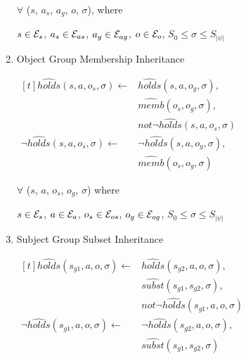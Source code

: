 \documentclass[10pt, twocolumn]{article}
\begin{document}
\begin{enumerate}
                $\forall$ ($s$, $a_{s}$, $a_{g}$, $o$, $\sigma$), where

                $s \in {\cal E}_{s}$,
                $a_{s} \in {\cal E}_{as}$,
                $a_{g} \in {\cal E}_{ag}$,
                $o \in {\cal E}_{o}$,
                $S_{0} \leq \sigma \leq S_{|\psi|}$

              \item
                Object Group Membership Inheritance

                \begin{math}
                  \begin{aligned}[t]
                    \hat{holds}(s, a, o_{s}, \sigma) \leftarrow &
                    \hat{holds}(s, a, o_{g}, \sigma), \\
                    & \hat{memb}(o_{s}, o_{g}, \sigma), \\
                    & not \lnot \hat{holds}(s, a, o_{s}, \sigma) \\
                    \lnot \hat{holds}(s, a, o_{s}, \sigma) \leftarrow &
                    \lnot \hat{holds}(s, a, o_{g}, \sigma), \\
                    & \hat{memb}(o_{s}, o_{g}, \sigma)
                  \end{aligned}
                \end{math}

                $\forall$ ($s$, $a$, $o_{s}$, $o_{g}$, $\sigma$) where

                $s \in {\cal E}_{s}$,
                $a \in {\cal E}_{a}$,
                $o_{s} \in {\cal E}_{os}$,
                $o_{g} \in {\cal E}_{og}$,
                $S_{0} \leq \sigma \leq S_{|\psi|}$

              \item
                Subject Group Subset Inheritance

                \begin{math}
                  \begin{aligned}[t]
                    \hat{holds}(s_{g1}, a, o, \sigma) \leftarrow &
                    \hat{holds}(s_{g2}, a, o, \sigma), \\
                    & \hat{subst}(s_{g1}, s_{g2}, \sigma), \\
                    & not \lnot \hat{holds}(s_{g1}, a, o, \sigma) \\
                    \lnot \hat{holds}(s_{g1}, a, o, \sigma) \leftarrow &
                    \lnot \hat{holds}(s_{g2}, a, o, \sigma), \\
                    & \hat{subst}(s_{g1}, s_{g2}, \sigma)
                  \end{aligned}
                \end{math}


\end{enumerate}
\end{document}
